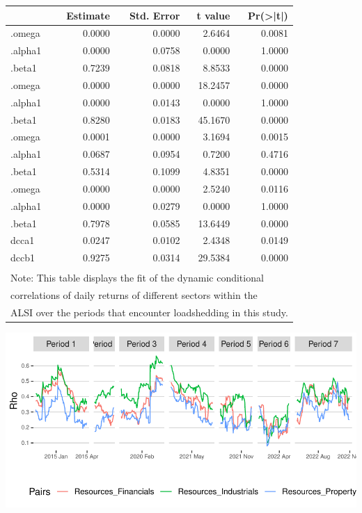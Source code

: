 \documentclass[11pt,preprint, authoryear]{elsarticle}
\let\origfigure\figure
\let\endorigfigure\endfigure
\renewenvironment{figure}[1][2] {
    \expandafter\origfigure\expandafter[H]
} {
    \endorigfigure
}
\let\origtable\table
\let\endorigtable\endtable
\renewenvironment{table}[1][2] {
    \expandafter\origtable\expandafter[H]
} {
    \endorigtable
}
\numberwithin{equation}{section}
\numberwithin{figure}{section}
\numberwithin{table}{section}
\begin{document}
\begin{table}
\centering\begingroup\fontsize{9}{11}\selectfont

\begin{tabular}{l|r|r|r|r}
\hline
  &  Estimate &  Std. Error &  t value & Pr(>|t|)\\
\hline
[Financials].omega & 0.0000 & 0.0000 & 2.6464 & 0.0081\\
\hline
[Financials].alpha1 & 0.0000 & 0.0758 & 0.0000 & 1.0000\\
\hline
[Financials].beta1 & 0.7239 & 0.0818 & 8.8533 & 0.0000\\
\hline
[Industrials].omega & 0.0000 & 0.0000 & 18.2457 & 0.0000\\
\hline
[Industrials].alpha1 & 0.0000 & 0.0143 & 0.0000 & 1.0000\\
\hline
[Industrials].beta1 & 0.8280 & 0.0183 & 45.1670 & 0.0000\\
\hline
[Property].omega & 0.0001 & 0.0000 & 3.1694 & 0.0015\\
\hline
[Property].alpha1 & 0.0687 & 0.0954 & 0.7200 & 0.4716\\
\hline
[Property].beta1 & 0.5314 & 0.1099 & 4.8351 & 0.0000\\
\hline
[Resources].omega & 0.0000 & 0.0000 & 2.5240 & 0.0116\\
\hline
[Resources].alpha1 & 0.0000 & 0.0279 & 0.0000 & 1.0000\\
\hline
[Resources].beta1 & 0.7978 & 0.0585 & 13.6449 & 0.0000\\
\hline
[Joint]dcca1 & 0.0247 & 0.0102 & 2.4348 & 0.0149\\
\hline
[Joint]dccb1 & 0.9275 & 0.0314 & 29.5384 & 0.0000\\
\hline
\multicolumn{5}{l}{\textsuperscript{} Note: This table displays the fit of the dynamic conditional}\\
\multicolumn{5}{l}{correlations of daily returns of different sectors within the}\\
\multicolumn{5}{l}{ALSI over the periods that encounter loadshedding in this study.}\\
\end{tabular}
\endgroup{}
\end{table}

\begin{figure}[H]

{\centering \includegraphics{Paper_files/figure-latex/DCClsr-1} 

}

\caption{Dynamic Conditional Correlations: Resources  \label{DCClsr}}\label{fig:DCClsr}
\end{figure}
\end{document}
